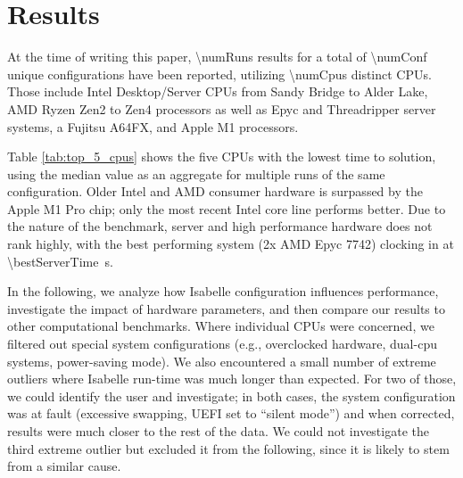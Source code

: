 
\section{Results}\label{sec:results}
At the time of writing this paper,
\num{\numRuns} results for a total of \num{\numConf} unique configurations have been reported,
utilizing \num{\numCpus} distinct CPUs.
Those include Intel Desktop/Server CPUs from Sandy Bridge to Alder Lake,
AMD Ryzen Zen2 to Zen4 processors as well as Epyc and Threadripper server systems,
a Fujitsu A64FX, and Apple M1 processors.


Table \ref{tab:top_5_cpus} shows the five CPUs with the lowest time to solution,
using the median value as an aggregate for multiple runs of the same configuration.
Older Intel and AMD consumer hardware is surpassed by the Apple M1 Pro chip;
only the most recent Intel core line performs better.
Due to the nature of the benchmark, server and high performance hardware does not rank highly,
with the best performing system (2x AMD Epyc 7742) clocking in at \SI{\bestServerTime}{\second}.

In the following, we analyze how Isabelle configuration influences performance,
investigate the impact of hardware parameters,
and then compare our results to other computational benchmarks.
Where individual CPUs were concerned,
we filtered out special system configurations (e.g., overclocked hardware, dual-cpu systems, power-saving mode).
We also encountered a small number of extreme outliers where Isabelle run-time was much longer than expected.
For two of those, we could identify the user and investigate;
in both cases, the system configuration was at fault
(excessive swapping, UEFI set to \enquote{silent mode})
and when corrected, results were much closer to the rest of the data.
We could not investigate the third extreme outlier but excluded it from the following,
since it is likely to stem from a similar cause.

